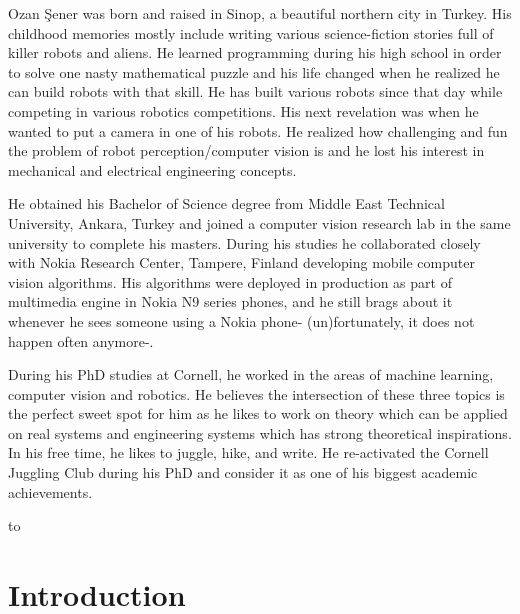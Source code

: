 \documentclass[phd,tocprelim]{cornell}
\begin{document}
\begin{biosketch}
Ozan \c{S}ener was born and raised in Sinop, a beautiful northern city in Turkey. His childhood memories mostly include writing various science-fiction stories full of killer robots and aliens. He learned programming during his high school in order to solve one nasty mathematical puzzle and his life changed when he realized he can build robots with that skill. He has built various robots since that day while competing in various robotics competitions. His next revelation was when he wanted to put a camera in one of his robots. He realized how challenging and fun the problem of robot perception/computer vision is and he lost his interest in mechanical and electrical engineering concepts. 

He obtained his Bachelor of Science degree from Middle East Technical University, Ankara, Turkey and joined a computer vision research lab in the same university to complete his masters. During his studies he collaborated closely with Nokia Research Center, Tampere, Finland developing mobile computer vision algorithms. His algorithms were deployed in production as part of multimedia engine in Nokia N9 series phones, and he still brags about it whenever he sees someone using a Nokia phone- (un)fortunately, it does not happen often anymore-. 

During his PhD studies at Cornell, he worked in the areas of machine learning, computer vision and robotics. He believes the intersection of these three topics is the perfect sweet spot for him as he likes to work on theory which can be applied on real systems and engineering systems which has strong theoretical inspirations. In his free time, he likes to juggle, hike, and write. He re-activated the Cornell Juggling Club during his PhD and consider it as one of his biggest academic achievements.
\end{biosketch}

\begin{dedication}
to 
\end{dedication}

\begin{acknowledgements}

\end{acknowledgements}

\contentspage
\tablelistpage
\figurelistpage

\normalspacing \setcounter{page}{1} 
\pagestyle{cornell} \addtolength{\parskip}{0.5\baselineskip}

\chapter{Introduction}

\end{document}
